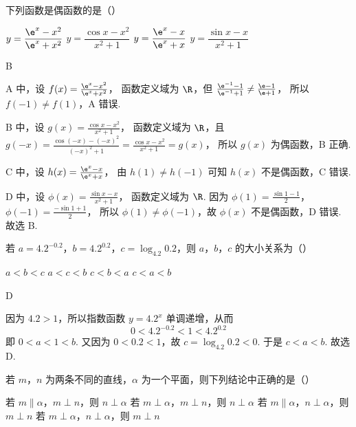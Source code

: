 \begin{problem}
下列函数是偶函数的是（\quad）

\choices
    {\(y=\dfrac{\e^x-x^2}{\e^x+x^2}\)}
    {\(y=\dfrac{\cos x-x^2}{x^2+1}\)}
    {\(y=\dfrac{\e^x-x}{\e^x+x}\)}
    {\(y=\dfrac{\sin x-x}{x^2+1}\)}
\end{problem}

\begin{answer}
B
\end{answer}

\begin{solution}
A 中，设
\(f(x)=\frac{\e^x-x^2}{\e^x+x^2}\)，
函数定义域为 \(\R\)，但
\(\frac{\e^{-1}-1}{\e^{-1}+1}\ne \frac{\e-1}{\e+1}\)，
所以 \(f(-1)\ne f(1)\)，A 错误.

B 中，设
\(g(x)=\frac{\cos x-x^2}{x^2+1}\)，
函数定义域为 \(\R\)，且
\(g(-x)=\frac{\cos(-x)-(-x)^2}{(-x)^2+1}=\frac{\cos x-x^2}{x^2+1}=g(x)\)，
所以 \(g(x)\) 为偶函数，B 正确.

C 中，设
\(h(x)=\frac{\e^x-x}{\e^x+x}\)，
由 \(h(1)\ne h(-1)\) 可知 \(h(x)\) 不是偶函数，C 错误.

D 中，设
\(\phi(x)=\frac{\sin x-x}{x^2+1}\)，
函数定义域为 \(\R\). 因为
\(\phi(1)=\frac{\sin 1-1}{2}\)，\(\phi(-1)=\frac{-\sin 1+1}{2}\)，
所以 \(\phi(1)\ne \phi(-1)\)，故 \(\phi(x)\) 不是偶函数，D 错误.
故选 B.
\end{solution}

\begin{problem}
若 \(a=4.2^{-0.2}\)，\(b=4.2^{0.2}\)，\(c=\log_{4.2}0.2\)，则 \(a\)，\(b\)，\(c\) 的大小关系为（\quad）

\choices
    {\(a<b<c\)}
    {\(a<c<b\)}
    {\(c<b<a\)}
    {\(c<a<b\)}
\end{problem}

\begin{answer}
D
\end{answer}

\begin{solution}
因为 \(4.2>1\)，所以指数函数 \(y=4.2^x\) 单调递增，从而
\[
0<4.2^{-0.2}<1<4.2^{0.2}
\]
即 \(0<a<1<b\). 又因为 \(0<0.2<1\)，故
\(c=\log_{4.2}0.2<0\). 于是 \(c<a<b\). 故选 D.
\end{solution}

\begin{problem}
若 \(m\)，\(n\) 为两条不同的直线，\(\alpha\) 为一个平面，则下列结论中正确的是（\quad）

\choices
    {若 \(m\parallel \alpha\)，\(m\perp n\)，则 \(n\perp \alpha\)}
    {若 \(m\perp \alpha\)，\(m\perp n\)，则 \(n\perp \alpha\)}
    {若 \(m\parallel \alpha\)，\(n\perp \alpha\)，则 \(m\perp n\)}
    {若 \(m\perp \alpha\)，\(n\perp \alpha\)，则 \(m\perp n\)}
\end{problem}

